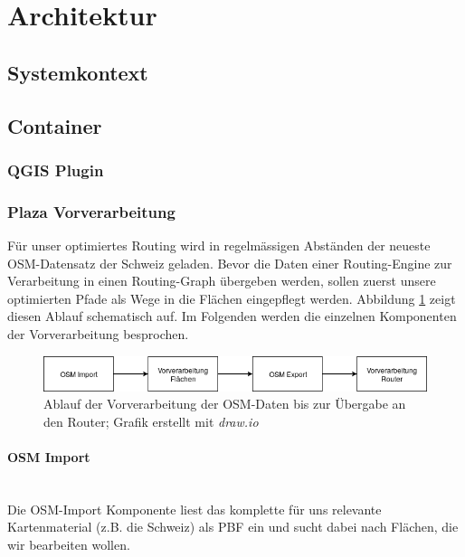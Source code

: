 
\section{Architektur}
\label{sec:Architektur}

\subsection{Systemkontext}
\label{architektur:Systemkontext}

\subsection{Container}
\label{architektur:Container}

\subsubsection{QGIS Plugin}
\label{architektur:QGIS Plugin}


\subsubsection{Plaza Vorverarbeitung}
\label{architektur:Plaza Vorverarbeitung}

Für unser optimiertes Routing wird in regelmässigen Abständen der neueste \ac{OSM}-Datensatz\cite{osm_data_switzerland} der Schweiz geladen. Bevor die Daten einer Routing-Engine zur Verarbeitung in einen Routing-Graph übergeben werden, sollen zuerst unsere optimierten Pfade als Wege in die Flächen eingepflegt werden. Abbildung \ref{fig:workflow_vorverarbeitung} zeigt diesen Ablauf schematisch auf. Im Folgenden werden die einzelnen Komponenten der Vorverarbeitung besprochen.

\begin{figure}[ht]
\centering
\includegraphics[width=1\linewidth]{projectdoc/img/workflow_vorverarbeitung.png}
\caption[Ablauf Vorverarbeitung]{Ablauf der Vorverarbeitung der \ac{OSM}-Daten bis zur Übergabe an den Router; Grafik erstellt mit \emph{draw.io}}
\label{fig:workflow_vorverarbeitung}
\end{figure}

\paragraph{OSM Import}~\\
Die \acs{OSM}-Import Komponente liest das komplette für uns relevante Kartenmaterial (z.B. die Schweiz) als \ac{PBF} ein und sucht dabei nach Flächen, die wir bearbeiten wollen.

